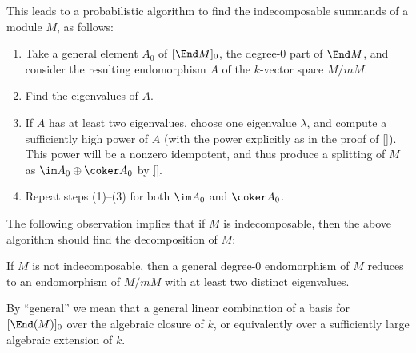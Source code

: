 \documentclass{article}
\let\l\lambda
\numberwithin{equation}{section}
\theoremstyle{theorem}
\numberwithin{thm}{section}
\theoremstyle{definition}
\begin{document}
This leads to a probabilistic algorithm to find the indecomposable summands of a module $M$, as follows:
\begin{enumerate}
\item Take a general element $A_0$ of $[\End M]_0$, the degree-0 part of $\End M$, and consider the resulting endomorphism $A$ of the $k$-vector space $M/mM$.
\item Find the eigenvalues of $A$.
\item If $A$ has at least two eigenvalues, choose one eigenvalue $\l$, and compute a sufficiently high power of $A$ (with the power explicitly as in the proof of \ref{}). This power will be a nonzero idempotent, and thus produce a splitting of $M$ as $\im A_0 \oplus \coker A_0$ by \ref{}.
\item Repeat steps (1)--(3) for both $\im A_0$ and $\coker A_0$.
\end{enumerate}

The following observation implies that if $M$ is indecomposable, then the above algorithm should find the decomposition of $M$:

\begin{lem}
  If $M$ is not indecomposable, then a general degree-0 endomorphism of $M$ reduces to an endomorphism of $M/mM$ with at least two distinct eigenvalues.
\end{lem}

\begin{rem}
  By ``general'' we mean that a general linear combination of a basis for $[\End(M)]_0$ over the algebraic closure of $k$, or equivalently over a sufficiently large algebraic extension of $k$.
\end{rem}
\end{document}
